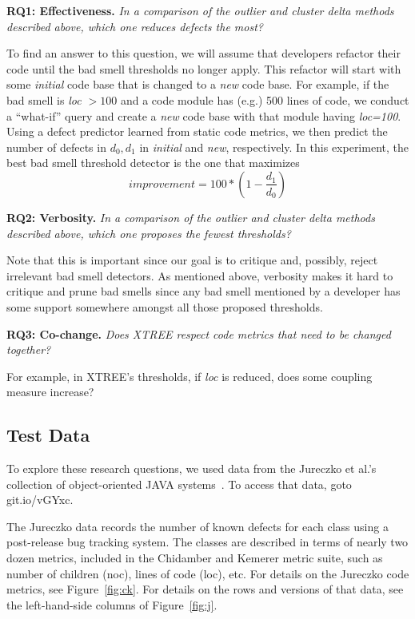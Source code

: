\documentclass{sig-alternate}
\newcommand{\fig}[1]{Figure~\ref{fig:#1}}
\begin{document}
\begin{itemize}
{\bf RQ1: Effectiveness.} {\em In a comparison of  the outlier and cluster delta
methods described above, which one reduces defects the most?}

To find an answer to this question, we will assume that developers
refactor their code until the bad smell thresholds no longer apply.
This refactor will start with some {\em initial} code
base that is changed to a {\em new} code base. 
For example, if the bad smell is {\em loc $>100$} and a 
code module has (e.g.) 500 lines of code, we conduct a ``what-if''
query and create a {\em new} code base with that module having {\em loc=100}.
Using a defect
predictor learned from static code metrics, we then predict the
number of defects in $d_0,d_1$ in {\em initial} and {\em new},
respectively. In this experiment,
the best bad smell threshold detector is the one that maximizes
\begin{equation}\label{eq:diff}
\mathit{improvement} = 100* \left(1 - \frac{ d_1 }{ d_0}\right)
\end{equation}

{\bf RQ2: Verbosity.}   {\em In a comparison of  the outlier and cluster delta
methods described above, which one proposes the fewest thresholds?}

Note that this is important since our goal is to critique and, possibly,
reject irrelevant bad smell detectors. As mentioned above,
  verbosity makes it hard   to critique and prune bad smells
since any bad smell mentioned by a developer has some support
somewhere amongst all those proposed thresholds.

{\bf RQ3: Co-change.}   {\em Does XTREE respect code
metrics that need to be changed together? }

For example, in XTREE's thresholds,  if {\em loc} is
reduced, does some coupling measure increase?

 


\subsection{Test Data}\label{sect:tesd}

To explore these research questions,
we used data from
the Jureczko et al.'s collection of object-oriented JAVA systems~\cite{jureczko10}. To access that data, goto   git.io/vGYxc.

The Jureczko data records the number of known defects for each class using a post-release bug tracking system. The classes are described in terms of nearly two dozen metrics, included in the Chidamber and Kemerer metric suite, such as number of children (noc), lines of code (loc), etc. For details on the Jureczko code
metrics, see  \fig{ck}. For details on the rows and versions
of that data, see the left-hand-side columns of \fig{j}.



\end{itemize}
\end{document}
